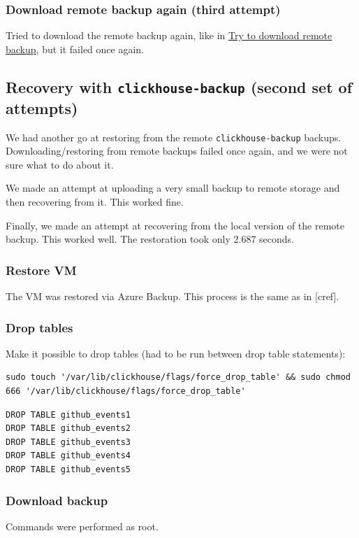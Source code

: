 \subsubsection{Download remote backup again (third attempt)}
\label{sec:org3f5a3c3}
Tried to download the remote backup again, like in \hyperref[sec:org8b2d881]{Try to download remote backup},
but it failed once again.
\subsection{Recovery with \texttt{clickhouse-backup} (second set of attempts)}
\label{sec:orgfaf1fce}
We had another go at restoring from the remote \texttt{clickhouse-backup} backups.
Downloading/restoring from remote backups
failed once again, and we were not sure what to do about it.

We made an attempt at uploading a very small backup to remote storage and then recovering from it.
This worked fine.

Finally, we made an attempt at recovering from the local version of the remote backup.
This worked well.
The restoration took only 2.687 seconds.

\subsubsection{Restore VM}
\label{sec:org46296f4}
The VM was restored via Azure Backup.
This process is the same as in [cref].
\subsubsection{Drop tables}
\label{sec:org5bece9d}
Make it possible to drop tables (had to be run between drop table statements):
\begin{verbatim}
sudo touch '/var/lib/clickhouse/flags/force_drop_table' && sudo chmod 666 '/var/lib/clickhouse/flags/force_drop_table'
\end{verbatim}

\begin{verbatim}
DROP TABLE github_events1
DROP TABLE github_events2
DROP TABLE github_events3
DROP TABLE github_events4
DROP TABLE github_events5
\end{verbatim}
\subsubsection{Download backup}
\label{sec:org25a0557}
Commands were performed as root.


